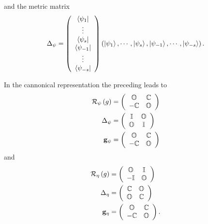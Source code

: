 \documentclass[aps,preprint]{revtex4}%
\begin{document}
and the metric matrix
\begin{equation}
\Delta_{\psi}=\left(
\begin{array}
[c]{c}%
\left\langle \psi_{1}\right\vert \\
\vdots\\
\left\langle \psi_{s}\right\vert \\
\left\langle \psi_{-1}\right\vert \\
\vdots\\
\left\langle \psi_{-s}\right\vert
\end{array}
\right)  \left(  \left\vert \psi_{1}\right\rangle ,\cdots,\left\vert \psi
_{s}\right\rangle ,\left\vert \psi_{-1}\right\rangle ,\cdots,\left\vert
\psi_{-s}\right\rangle \right)  .
\end{equation}


In the cannonical representation the preceding leads to
\begin{align}
\mathcal{R}_{\psi}\left(  g\right)   &  =\left(
\begin{array}
[c]{cc}%
\mathbb{O} & \mathbb{C}\\
-\mathbb{C} & \mathbb{O}%
\end{array}
\right) \\
\Delta_{\psi}  &  =\left(
\begin{array}
[c]{cc}%
\mathbb{I} & \mathbb{O}\\
\mathbb{O} & \mathbb{I}%
\end{array}
\right) \\
\mathbf{g}_{\psi}  &  =\left(
\begin{array}
[c]{cc}%
\mathbb{O} & \mathbb{C}\\
-\mathbb{C} & \mathbb{O}%
\end{array}
\right)
\end{align}
and
\begin{align}
\mathcal{R}_{\eta}\left(  g\right)   &  =\left(
\begin{array}
[c]{cc}%
\mathbb{O} & \mathbb{I}\\
-\mathbb{I} & \mathbb{O}%
\end{array}
\right) \\
\Delta_{\eta}  &  =\left(
\begin{array}
[c]{cc}%
\mathbb{C} & \mathbb{O}\\
\mathbb{O} & \mathbb{C}%
\end{array}
\right) \\
\mathbf{g}_{\eta}  &  =\left(
\begin{array}
[c]{cc}%
\mathbb{O} & \mathbb{C}\\
-\mathbb{C} & \mathbb{O}%
\end{array}
\right)  .
\end{align}
\end{document}
